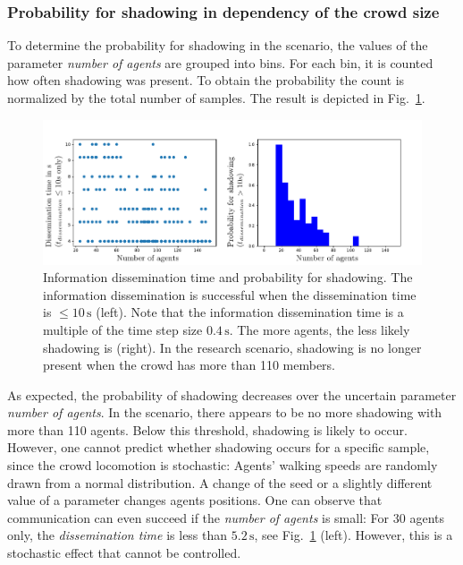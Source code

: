 \subsubsection{Probability for shadowing in dependency of the crowd size}

To determine the probability for shadowing in the scenario, the values of the parameter \textit{number of agents} are grouped into bins. For each bin, it is counted how often shadowing was present. To obtain the probability the count is normalized by the total number of samples. The result is depicted in Fig.~\ref{fig:shadowing}. 

\begin{figure}[hbt!]
\includegraphics[width=\textwidth]{../figures/investigation/crownetOutput/shadowing/ProbabilityforShadowingCrowdSize.pdf} 
\caption[Information dissemination time and probability for shadowing]{Information dissemination time and probability for shadowing. The information dissemination is successful when the dissemination time is $\leq10\,\text{s}$ (left).  Note that the information dissemination time is a multiple of the time step size $0.4\,\text{s}$. The more agents, the less likely shadowing is (right). In the research scenario, shadowing is no longer present when the crowd has more than 110 members. }
\label{fig:shadowing}
\end{figure}


As expected, the probability of shadowing decreases over the uncertain parameter \textit{number of agents}. In the scenario, there appears to be no more shadowing with more than 110 agents. Below this threshold, shadowing is likely to occur. However, one cannot predict whether shadowing occurs for a specific sample, since the crowd locomotion is stochastic: Agents' walking speeds are randomly drawn from a normal distribution. A change of the seed or a slightly different value of a parameter changes agents positions. One can observe that communication can even succeed if the \textit{number of agents} is small: For 30 agents only, the \textit{dissemination time} is less than $5.2\,\text{s}$, see Fig.~\ref{fig:shadowing} (left). However, this is a stochastic effect that cannot be controlled.



